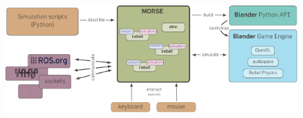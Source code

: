 \documentclass[compress]{beamer}
\begin{document}
\begin{frame}

\begin{figure}
\centering
\includegraphics[width=\linewidth]{morse}







\end{figure}
\end{frame}
\end{document}

